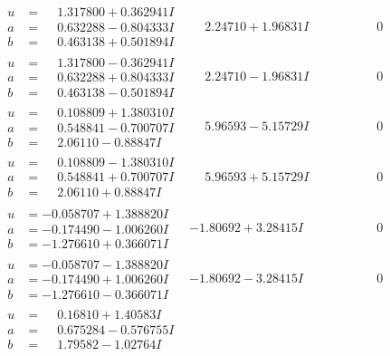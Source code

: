 \documentclass[1p]{elsarticle_modified}
\theoremstyle{definition}
\begin{document}
$$\begin{array}{c|c|c}
\begin{aligned}
u &= \phantom{-}1.317800 + 0.362941 I \\
a &= \phantom{-}0.632288 - 0.804333 I \\
b &= \phantom{-}0.463138 + 0.501894 I\end{aligned}
 & \phantom{-}2.24710 + 1.96831 I & \phantom{-0.000000 } 0 \\ \hline\begin{aligned}
u &= \phantom{-}1.317800 - 0.362941 I \\
a &= \phantom{-}0.632288 + 0.804333 I \\
b &= \phantom{-}0.463138 - 0.501894 I\end{aligned}
 & \phantom{-}2.24710 - 1.96831 I & \phantom{-0.000000 } 0 \\ \hline\begin{aligned}
u &= \phantom{-}0.108809 + 1.380310 I \\
a &= \phantom{-}0.548841 - 0.700707 I \\
b &= \phantom{-}2.06110 - 0.88847 I\end{aligned}
 & \phantom{-}5.96593 - 5.15729 I & \phantom{-0.000000 } 0 \\ \hline\begin{aligned}
u &= \phantom{-}0.108809 - 1.380310 I \\
a &= \phantom{-}0.548841 + 0.700707 I \\
b &= \phantom{-}2.06110 + 0.88847 I\end{aligned}
 & \phantom{-}5.96593 + 5.15729 I & \phantom{-0.000000 } 0 \\ \hline\begin{aligned}
u &= -0.058707 + 1.388820 I \\
a &= -0.174490 - 1.006260 I \\
b &= -1.276610 + 0.366071 I\end{aligned}
 & -1.80692 + 3.28415 I & \phantom{-0.000000 } 0 \\ \hline\begin{aligned}
u &= -0.058707 - 1.388820 I \\
a &= -0.174490 + 1.006260 I \\
b &= -1.276610 - 0.366071 I\end{aligned}
 & -1.80692 - 3.28415 I & \phantom{-0.000000 } 0 \\ \hline\begin{aligned}
u &= \phantom{-}0.16810 + 1.40583 I \\
a &= \phantom{-}0.675284 - 0.576755 I \\
b &= \phantom{-}1.79582 - 1.02764 I\end{aligned}

\end{array}$$
\end{document}
